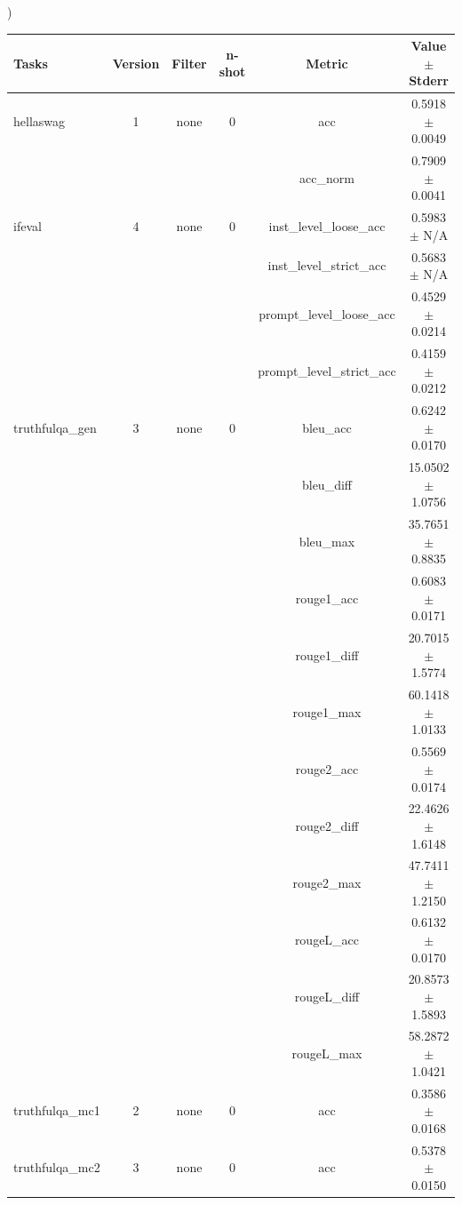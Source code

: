 \documentclass{ifacconf}
\begin{document}
\begin{strip}
\begin{minipage}{\textwidth}
			\begin{table}[H]
				\centering
				)
				\begin{tabular}{|l|c|c|c|c|c|}
					\hline
					\textbf{Tasks} & \textbf{Version} & \textbf{Filter} & \textbf{n-shot} & \textbf{Metric} & \textbf{Value} $\pm$ \textbf{Stderr} \\ \hline
					hellaswag & 1 & none & 0 & acc & 0.5918 $\pm$ 0.0049 \\ \hline
					& & & & acc\_norm & 0.7909 $\pm$ 0.0041 \\ \hline
					ifeval & 4 & none & 0 & inst\_level\_loose\_acc & 0.5983 $\pm$ N/A \\ \hline
					& & & & inst\_level\_strict\_acc & 0.5683 $\pm$ N/A \\ \hline
					& & & & prompt\_level\_loose\_acc & 0.4529 $\pm$ 0.0214 \\ \hline
					& & & & prompt\_level\_strict\_acc & 0.4159 $\pm$ 0.0212 \\ \hline
					truthfulqa\_gen & 3 & none & 0 & bleu\_acc & 0.6242 $\pm$ 0.0170 \\ \hline
					& & & & bleu\_diff & 15.0502 $\pm$ 1.0756 \\ \hline
					& & & & bleu\_max & 35.7651 $\pm$ 0.8835 \\ \hline
					& & & & rouge1\_acc & 0.6083 $\pm$ 0.0171 \\ \hline
					& & & & rouge1\_diff & 20.7015 $\pm$ 1.5774 \\ \hline
					& & & & rouge1\_max & 60.1418 $\pm$ 1.0133 \\ \hline
					& & & & rouge2\_acc & 0.5569 $\pm$ 0.0174 \\ \hline
					& & & & rouge2\_diff & 22.4626 $\pm$ 1.6148 \\ \hline
					& & & & rouge2\_max & 47.7411 $\pm$ 1.2150 \\ \hline
					& & & & rougeL\_acc & 0.6132 $\pm$ 0.0170 \\ \hline
					& & & & rougeL\_diff & 20.8573 $\pm$ 1.5893 \\ \hline
					& & & & rougeL\_max & 58.2872 $\pm$ 1.0421 \\ \hline
					truthfulqa\_mc1 & 2 & none & 0 & acc & 0.3586 $\pm$ 0.0168 \\ \hline
					truthfulqa\_mc2 & 3 & none & 0 & acc & 0.5378 $\pm$ 0.0150 \\ \hline
				\end{tabular}
				\label{tab:llama31_q6k}
			\end{table}
		\end{minipage}
	\end{strip}
	
\end{document}
